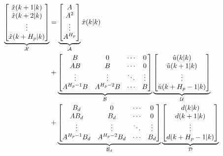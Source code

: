 \begin{equation}\label{eq:lifted_state_equation}
\begin{aligned}
	  \underbrace{\begin{bmatrix}
	  \hat{x}(k+1|k) 	\\
	  \hat{x}(k+2|k) 	\\
	  \vdots 			\\
	  \hat{x}(k+H_p|k) 	\\
	   \end{bmatrix}}_{\CMcal{X}}
	 &=
	\underbrace{\begin{bmatrix}
		A \\
		A^2 \\
		\vdots \\
		A^{H_p} \\
	\end{bmatrix}}_{\CMcal{A}}
	\hat{x}(k|k) \\&+
	\underbrace{\begin{bmatrix}
		B 		 &0			 &\cdots	& 0		\\
		AB  	 &B  		 & \cdots& 0		\\
		\vdots 	 &\vdots	 & \ddots&\vdots	\\
		A^{H_p-1}B&A^{H_p-2}B&\cdots &B 
    \end{bmatrix}}_{\CMcal{B}}
    	\underbrace{\begin{bmatrix}
	\hat{u}(k|k)\\
	\hat{u}(k+1|k)\\
	\vdots\\
	\hat{u}(k+H_p-1|k)
	\end{bmatrix}}_{\CMcal{U}} \\ &+ 
    \underbrace{\begin{bmatrix}
    	B_d 	    &0	         &\cdots & 0		\\
		AB_d  	    &B_d  	     & \cdots& 0		\\
		\vdots 	    &\vdots	     & \ddots&\vdots	\\
		A^{H_p-1}B_d&A^{H_p-2}B_d&\cdots &B_d 
	  \end{bmatrix}}_{\CMcal{B}_d} 
	\underbrace{\begin{bmatrix}
	d(k|k)\\
	d(k+1|k)\\
	\vdots\\
	d(k+H_p-1|k)
	\end{bmatrix}}_{\CMcal{D}}
	\end{aligned}
\end{equation}

